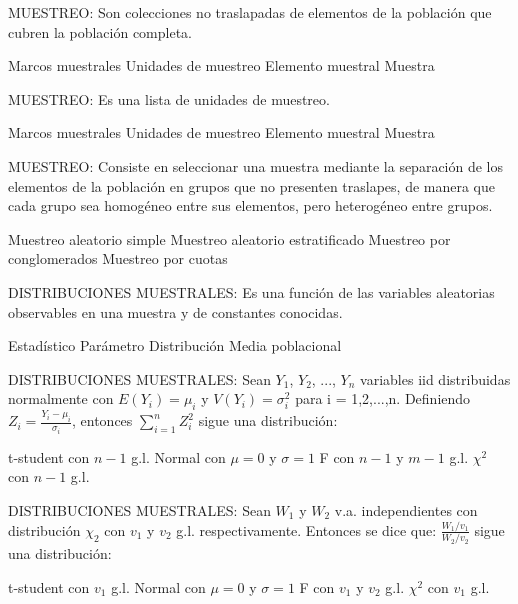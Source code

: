 \documentclass[addpoints]{exam}
\theoremstyle{mytheor}
\begin{document}
  \begin{questions}
  
  \question MUESTREO: Son colecciones no traslapadas de elementos de la población que cubren la población completa.
  
  \begin{checkboxes}
  \choice Marcos muestrales
  \choice Unidades de muestreo
  \choice Elemento muestral
  \choice Muestra
  \end{checkboxes}
  
  \question MUESTREO: Es una lista de unidades de muestreo.
  
  \begin{checkboxes}
  \choice Marcos muestrales
  \choice Unidades de muestreo
  \choice Elemento muestral
  \choice Muestra
  \end{checkboxes}
  
  \question MUESTREO:  Consiste en seleccionar una muestra mediante la separación de los elementos de la población en grupos que no presenten traslapes, de manera que cada grupo sea homogéneo entre sus elementos, pero heterogéneo entre grupos.
  
  \begin{checkboxes}
  \choice Muestreo aleatorio simple
  \choice Muestreo aleatorio estratificado
  \choice Muestreo por conglomerados
  \choice Muestreo por cuotas
  \end{checkboxes}
  
  
  \question DISTRIBUCIONES MUESTRALES: Es una función de las variables aleatorias observables en una muestra y de constantes conocidas.
  
  \begin{checkboxes}
  \choice Estadístico 
  \choice Parámetro
  \choice Distribución
  \choice Media poblacional
  \end{checkboxes}
  
  
  \question DISTRIBUCIONES MUESTRALES: Sean $Y_1$, $Y_2$, ..., $Y_n$ variables iid distribuidas normalmente con $E(Y_i) = \mu_i$ y $V(Y_i) = \sigma_i^2$ para i = 1,2,...,n. Definiendo $Z_i = \frac{Y_i - \mu_i}{\sigma_i}$, entonces $\sum_{i = 1}^{n} Z_i^2$ sigue una distribución:
    \begin{checkboxes}
  \choice t-student con $n-1$ g.l.
  \choice Normal con $\mu = 0$ y $\sigma = 1$ 
    \choice F con $n-1$ y $m-1$ g.l.
  \choice $\chi^2$ con $n-1$ g.l.
  \end{checkboxes}
  
  
  \question DISTRIBUCIONES MUESTRALES: Sean $W_1$ y $W_2$ v.a. independientes con distribución $\chi_2$ con $v_1$ y $v_2$ g.l. respectivamente. Entonces se dice que: $\frac{W_1/v_1}{W_2/v_2}$ sigue una distribución:
    
    \begin{checkboxes}
  \choice t-student con $v_1$ g.l.
  \choice Normal con $\mu = 0$ y $\sigma = 1$ 
    \choice F con $v_1$ y $v_2$ g.l.
  \choice $\chi^2$ con $v_1$ g.l.
  \end{checkboxes}
  
  
  \end{questions}
  
\end{document}
